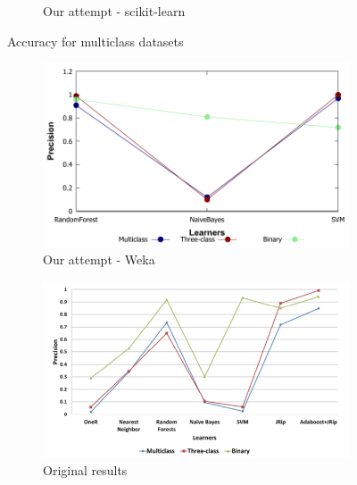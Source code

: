 \begin{figure}[H]
\begin{subfigure}[t]{0.4\textwidth}
        \caption{Our attempt - scikit-learn}
    \end{subfigure}
    \caption{Accuracy for multiclass datasets}
    \label{fig:weka_accall}
\end{figure}

\begin{figure}[H]
    \centering
    \begin{subfigure}[t]{0.4\textwidth}
        \includegraphics[width=\linewidth]{images/weka_precision}
        \caption{Our attempt - Weka}
    \end{subfigure}%
    \begin{subfigure}[t]{0.4\textwidth}
        \includegraphics[width=\linewidth]{images/weka_precision_cite.png}
        \caption{Original results \cite{borges_hink_machine_2014-1}}
    \end{subfigure}
    \begin{subfigure}[t]{0.4\textwidth}

\end{subfigure}
\end{figure}
